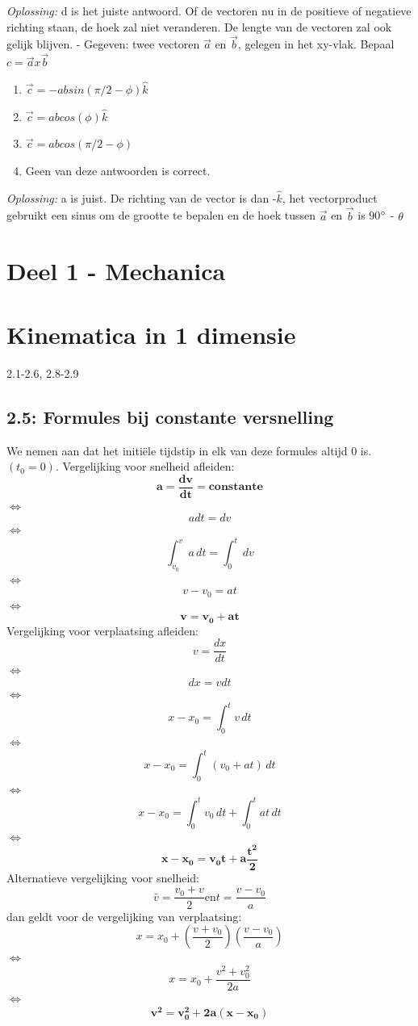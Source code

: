 \documentclass[12pt,a4paper]{article}
\begin{document}
    \textit{Oplossing:} d is het juiste antwoord. Of de vectoren nu in de positieve of negatieve richting staan, de hoek zal niet veranderen. De lengte van de vectoren zal ook gelijk blijven.
    \newline
    - Gegeven: twee vectoren $\overrightarrow{a}$ en $\overrightarrow{b}$, gelegen in het xy-vlak. Bepaal \(c = \overrightarrow{a} x \overrightarrow{b}\)
    \begin{enumerate}
        [label=\alph*)]
        \item \(\overrightarrow{c} = - ab sin(\pi/2 - \phi)\hat{k}\)
        \item \(\overrightarrow{c} = abcos(\phi)\hat{k}\)
        \item \(\overrightarrow{c} = abcos(\pi/2 - \phi)\)
        \item Geen van deze antwoorden is correct.
    \end{enumerate}
    \textit{Oplossing:} a is juist. De richting van de vector is dan -$\hat{k}$, het vectorproduct gebruikt een sinus om de grootte te bepalen en de hoek tussen $\overrightarrow{a}$ en $\overrightarrow{b}$ is 90$\degree$ - $\theta$
    \newpage


    \section{Deel 1 - Mechanica}


    \section{Kinematica in 1 dimensie}
    2.1-2.6, 2.8-2.9

    \subsection{2.5: Formules bij constante versnelling}
    We nemen aan dat het initiële tijdstip in elk van deze formules altijd 0 is. \((t_{0} = 0)\).
    Vergelijking voor snelheid afleiden:
    \[\mathbf{a = \frac{dv}{dt} = constante}\]
    $\iff$ \[a dt = dv\]
    $\iff$ \[\int_{v_0}^{v} a \, dt = \int_{0}^{t} \,dv\]
    $\iff$\[v - v_0 = at\]
    $\iff$\[\mathbf{v = v_0 + at}\]
    Vergelijking voor verplaatsing afleiden:
    \[v = \frac{dx}{dt}\]
    $\iff$\[dx = v dt\]
    $\iff$\[x - x_0 = \int_{0}^{t} v \, dt\]
    $\iff$\[x - x_0 = \int_{0}^{t} (v_0 + at) \, dt\]
    $\iff$\[x - x_0 = \int_{0}^{t} v_0 \, dt + \int_{0}^{t} at \, dt\]
    $\iff$\[\mathbf{x - x_0 = v_0t + a\frac{t^2}{2}}\]
    Alternatieve vergelijking voor snelheid:
    \[\bar{v} = \frac{v_0 + v}{2} \text{en} t = \frac{v - v_0}{a}\]
    dan geldt voor de vergelijking van verplaatsing:
    \[x = x_0 + (\frac{v + v_0}{2})(\frac{v - v_0}{a})\]
    $\iff$\[x = x_0 + \frac{v^2 + v_0^2}{2a}\]
    $\iff$\[\mathbf{v^2 = v_0^2 + 2a(x - x_0)}\]
\end{document}
